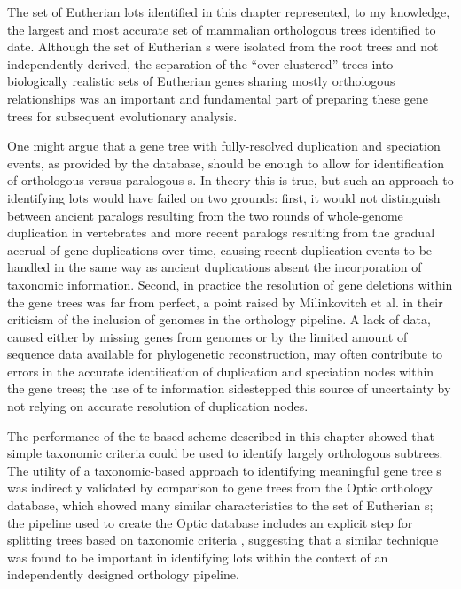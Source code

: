 The set of Eutherian \acp{lot} identified in this chapter represented,
to my knowledge, the largest and most accurate set of mammalian
orthologous trees identified to date. Although the set of Eutherian
\subtr{}s were isolated from the \cmp root trees and not independently
derived, the separation of the ``over-clustered'' \cmp trees into
biologically realistic sets of Eutherian genes sharing mostly
orthologous relationships was an important and fundamental part of
preparing these gene trees for subsequent evolutionary
analysis.

One might argue that a gene tree with fully-resolved duplication and
speciation events, as provided by the \cmp database, should be enough
to allow for identification of orthologous versus paralogous
\subtr{}s. In theory this is true, but such an approach to identifying
\acp{lot} would have failed on two grounds: first, it would not
distinguish between ancient paralogs resulting from the two rounds of
whole-genome duplication in vertebrates and more recent paralogs
resulting from the gradual accrual of gene duplications over time,
causing recent duplication events to be handled in the same way as
ancient duplications absent the incorporation of taxonomic
information. Second, in practice the resolution of gene deletions
within the \cmp gene trees was far from perfect, a point raised by
Milinkovitch et al. \citeyearpar{Milinkovitch2010} in their criticism
of the inclusion of \lcv genomes in the \ens \cmp orthology
pipeline. A lack of data, caused either by missing genes from \lcv
genomes or by the limited amount of sequence data available for
phylogenetic reconstruction, may often contribute to errors in the
accurate identification of duplication and speciation nodes within the
\cmp gene trees; the use of \ac{tc} information sidestepped this
source of uncertainty by not relying on accurate resolution of
duplication nodes.

The performance of the \ac{tc}-based scheme described in this chapter
showed that simple taxonomic criteria could be used to identify
largely orthologous subtrees. The utility of a taxonomic-based
approach to identifying meaningful gene tree \subtr{}s was indirectly
validated by comparison to gene trees from the Optic orthology
database, which showed many similar characteristics to the set of
Eutherian \subtr{}s; the pipeline used to create the Optic database
includes an explicit step for splitting trees based on taxonomic
criteria \citep{Heger2008}, suggesting that a similar technique was
found to be important in identifying \acp{lot} within the context of
an independently designed orthology pipeline.

